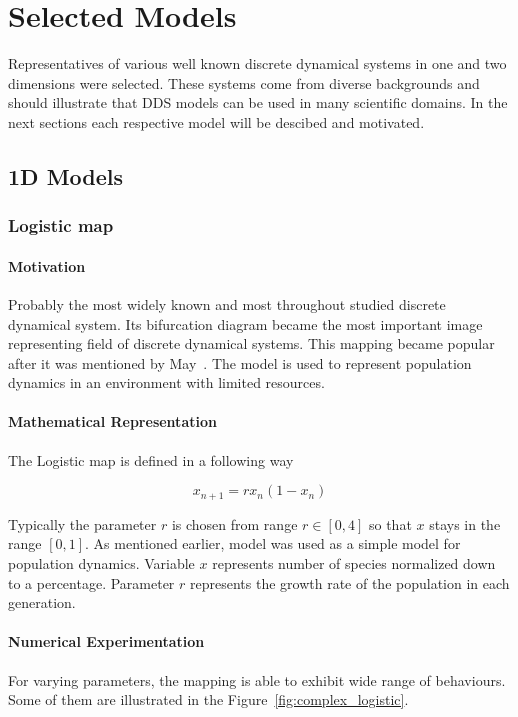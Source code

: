 \chapter{Selected Models}
Representatives of various well known discrete dynamical systems in one and two dimensions were selected. These systems come from diverse backgrounds and should illustrate that DDS models can be used in many scientific domains. In the next sections each respective model will be descibed and motivated.

\section{1D Models}

\subsection{Logistic map}
\label{subsec:Logistic map}

\subsubsection{Motivation}
Probably the most widely known and most throughout studied discrete dynamical system.
Its bifurcation diagram became the most important image representing field of discrete dynamical systems.
This mapping became popular after it was mentioned by May~\cite{May19760610}.
The model is used to represent population dynamics in an environment with limited resources.

\subsubsection{Mathematical Representation}
The Logistic map is defined in a following way

\begin{equation}
    x_{n+1} = r x_{n} ( 1 - x_{n} )
\end{equation}

Typically the parameter $r$ is chosen from range $r \in [0, 4]$ so that $x$ stays in the range $[0,1]$.
As mentioned earlier, model was used as a simple model for population dynamics.
Variable $x$ represents number of species normalized down to a percentage.
Parameter $r$ represents the growth rate of the population in each generation.

\subsubsection{Numerical Experimentation}
For varying parameters, the mapping is able to exhibit wide range of behaviours.
Some of them are illustrated in the Figure~\ref{fig:complex_logistic}.

